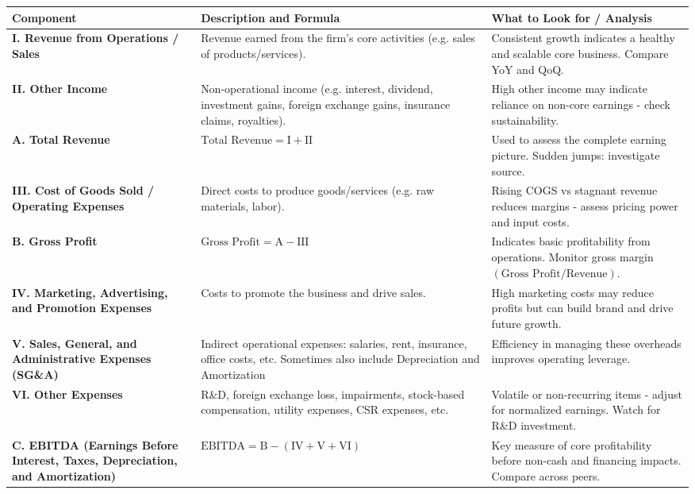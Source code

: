 \documentclass[12pt]{article}
\begin{document}
\begin{longtable}{|>{\raggedright\arraybackslash}p{2.5cm}|>{\raggedright\arraybackslash}p{6cm}|>{\raggedright\arraybackslash}p{4.5cm}|}
\hline
\textbf{Component} & \textbf{Description and Formula} & \textbf{What to Look for / Analysis} \\
\hline
\textbf{I. Revenue from Operations / Sales} & Revenue earned from the firm's core activities (e.g. sales of products/services). & Consistent growth indicates a healthy and scalable core business. Compare YoY and QoQ. \\
\hline
\textbf{II. Other Income} & Non-operational income (e.g. interest, dividend, investment gains, foreign exchange gains, insurance claims, royalties). & High other income may indicate reliance on non-core earnings - check sustainability. \\
\hline
\textbf{A. Total Revenue} & \( \text{Total Revenue} = \text{I} + \text{II} \) & Used to assess the complete earning picture. Sudden jumps: investigate source. \\
\hline
\textbf{III. Cost of Goods Sold / Operating Expenses} & Direct costs to produce goods/services (e.g. raw materials, labor). & Rising COGS vs stagnant revenue reduces margins - assess pricing power and input costs. \\
\hline
\textbf{B. Gross Profit} & \( \text{Gross Profit} = \text{A} - \text{III} \) & Indicates basic profitability from operations. Monitor gross margin \((\text{Gross Profit} / \text{Revenue})\). \\
\hline
\textbf{IV. Marketing, Advertising, and Promotion Expenses} & Costs to promote the business and drive sales. & High marketing costs may reduce profits but can build brand and drive future growth. \\
\hline
\textbf{V. Sales, General, and Administrative Expenses (SG\&A)} & Indirect operational expenses: salaries, rent, insurance, office costs, etc. Sometimes also include Depreciation and Amortization & Efficiency in managing these overheads improves operating leverage. \\
\hline
\textbf{VI. Other Expenses} & R\&D, foreign exchange loss, impairments, stock-based compensation, utility expenses, CSR expenses, etc. & Volatile or non-recurring items - adjust for normalized earnings. Watch for R\&D investment. \\
\hline
\textbf{C. EBITDA (Earnings Before Interest, Taxes, Depreciation, and Amortization)} & \( \text{EBITDA} = \text{B} - (\text{IV} + \text{V} + \text{VI}) \) & Key measure of core profitability before non-cash and financing impacts. Compare across peers. \\

\end{longtable}
\end{document}

